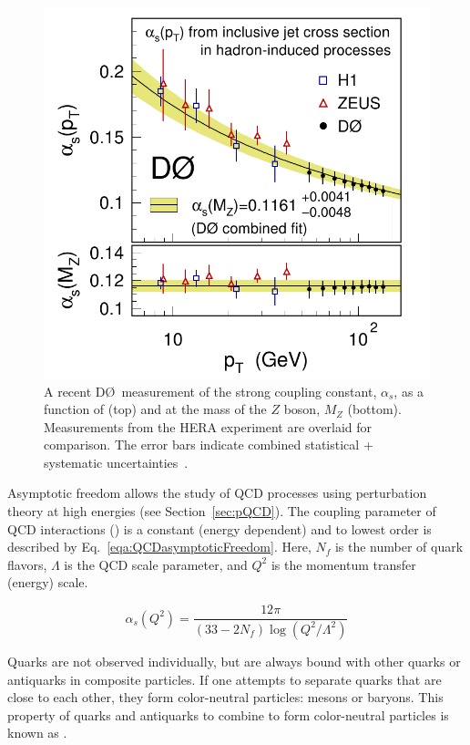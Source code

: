 \begin{figure}[p]
 \centering
 \includegraphics[scale=0.75]{./RunningStrongCoupling.png}
 \caption{A recent D\O~measurement of the strong coupling constant, $\alpha_{s}$, as a function of \pt (top) and at the mass of the $Z$ boson, $M_Z$ (bottom). Measurements from the HERA experiment are overlaid for comparison. The error bars indicate combined statistical + systematic uncertainties~\cite{pap:D0_StrongCoupling}.}
 \label{fig:RunStrongCoupling}
\end{figure}

Asymptotic freedom allows the study of QCD processes using perturbation theory at high energies (see Section~\ref{sec:pQCD}). The coupling parameter of QCD interactions (\alphas) is a  constant (energy dependent) and to lowest order is described by Eq.~\ref{eqa:QCDasymptoticFreedom}. Here, $N_{f}$ is the number of quark flavors, $\Lambda$ is the QCD scale parameter, and $Q^{2}$ is the momentum transfer (energy) scale.

\begin{equation}
 \alpha_{s} (Q^{2}) =\frac{12\pi}{(33 - 2 N_{f})\log(Q^{2}/\Lambda^{2})}
 \label{eqa:QCDasymptoticFreedom}
\end{equation}

Quarks are not observed individually, but are always bound with other quarks or antiquarks in composite particles. If one attempts to separate quarks that are close to each other, they form color-neutral particles: mesons or baryons. This property of quarks and antiquarks to combine to form color-neutral particles is known as .

